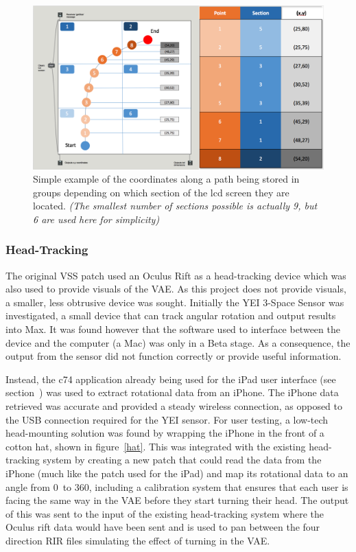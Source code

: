 \documentclass[../../main.tex]{subfiles}
\begin{document}
			\begin{figure}
				\centerline{\includegraphics[width=\textwidth]{Sections/Implementation/Max/images/Max/UserInterface/locationsExample2.png}}
				\caption{Simple example of the coordinates along a path being stored in groups depending on which section of the lcd screen they are located. \textit{(The smallest number of sections possible is actually 9, but 6 are used here for simplicity)}}
				\label{locationsExample}
			\end{figure}

	\subsubsection{Head-Tracking}

		The original \ac{VSS} patch used an Oculus Rift as a head-tracking device which was also used to provide visuals of the \ac{VAE}. As this project does not provide visuals, a smaller, less obtrusive device was sought. Initially the YEI 3-Space Sensor \cite{YEI} was investigated, a small device that can track angular rotation and output results into Max. It was found however that the software used to interface between the device and the computer (a Mac) was only in a Beta stage. As a consequence, the output from the sensor did not function correctly or provide useful information.

		Instead, the c74 application already being used for the iPad user interface (see section~) was used to extract rotational data from an iPhone. The iPhone data retrieved was accurate and provided a steady wireless connection, as opposed to the USB connection required for the YEI sensor. For user testing, a low-tech head-mounting solution was found by wrapping the iPhone in the front of a cotton hat, shown in figure~\ref{hat}. This was integrated with the existing head-tracking system by creating a new patch that could read the data from the iPhone (much like the patch used for the iPad) and map its rotational data to an angle from 0\textdegree~to 360\textdegree, including a calibration system that ensures that each user is facing the same way in the \ac{VAE} before they start turning their head. The output of this was sent to the input of the existing head-tracking system where the Oculus rift data would have been sent and is used to pan between the four direction \ac{RIR} files simulating the effect of turning in the \ac{VAE}.
\end{document}

